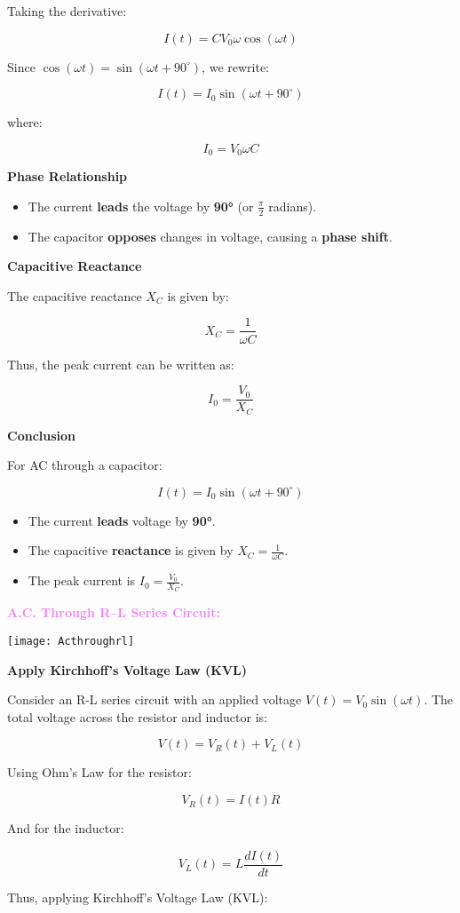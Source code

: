 \documentclass{beamer}
\begin{document}
\begin{frame}

Taking the derivative:

\[
I(t) = C V_0 \omega \cos(\omega t)
\]

Since \( \cos(\omega t) = \sin(\omega t + 90^\circ) \), we rewrite:

\[
I(t) = I_0 \sin(\omega t + 90^\circ)
\]

where:

\[
I_0 = V_0 \omega C
\]

\textbf{Phase Relationship}

\begin{itemize}
    \item The current \textbf{leads} the voltage by \textbf{90°} (or \( \frac{\pi}{2} \) radians).
    \item The capacitor \textbf{opposes} changes in voltage, causing a \textbf{phase shift}.
\end{itemize}

\textbf{Capacitive Reactance}

The capacitive reactance \( X_C \) is given by:

\[
X_C = \frac{1}{\omega C}
\]
\end{frame}


\begin{frame}
Thus, the peak current can be written as:

\[
I_0 = \frac{V_0}{X_C}
\]

\textbf{Conclusion}

For AC through a capacitor:

\[
I(t) = I_0 \sin(\omega t + 90^\circ)
\]

\begin{itemize}
    \item The current \textbf{leads} voltage by \textbf{90°}.
    \item The capacitive \textbf{reactance} is given by \( X_C = \frac{1}{\omega C} \).
    \item The peak current is \( I_0 = \frac{V_0}{X_C} \).
\end{itemize}
\end{frame}


\begin{frame}
\textcolor{violet}{\textbf{A.C. Through R–L Series Circuit:}}\\
\begin{center}
\texttt{[image: Acthroughrl]}
\end{center}
\textbf{Apply Kirchhoff’s Voltage Law (KVL)}

Consider an R-L series circuit with an applied voltage \( V(t) = V_0 \sin(\omega t) \). The total voltage across the resistor and inductor is:

\[
V(t) = V_R(t) + V_L(t)
\]

Using Ohm's Law for the resistor:

\[
V_R(t) = I(t) R
\]

And for the inductor:

\[
V_L(t) = L \frac{dI(t)}{dt}
\]

Thus, applying Kirchhoff’s Voltage Law (KVL):

\end{frame}
\end{document}
